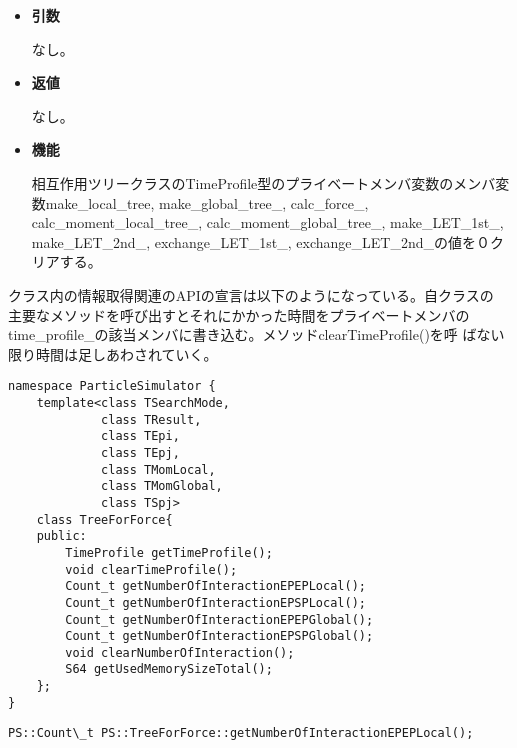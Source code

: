 \begin{itemize}

\item {\bf 引数}

なし。

\item {\bf 返値}

なし。

\item {\bf 機能}

相互作用ツリークラスのTimeProfile型のプライベートメンバ変数のメンバ変
数make\_local\_tree, make\_global\_tree\_, calc\_force\_,
calc\_moment\_local\_tree\_, calc\_moment\_global\_tree\_,
make\_LET\_1st\_, make\_LET\_2nd\_, exchange\_LET\_1st\_,
exchange\_LET\_2nd\_の値を０クリアする。

\end{itemize}


クラス内の情報取得関連のAPIの宣言は以下のようになっている。自クラスの
主要なメソッドを呼び出すとそれにかかった時間をプライベートメンバの
time\_profile\_の該当メンバに書き込む。メソッドclearTimeProfile()を呼
ばない限り時間は足しあわされていく。

\begin{lstlisting}[caption=TreeForForce2]
namespace ParticleSimulator {
    template<class TSearchMode,
             class TResult,
             class TEpi,
             class TEpj,
             class TMomLocal,
             class TMomGlobal,
             class TSpj>
    class TreeForForce{
    public:
        TimeProfile getTimeProfile();
        void clearTimeProfile();
        Count_t getNumberOfInteractionEPEPLocal();
        Count_t getNumberOfInteractionEPSPLocal();
        Count_t getNumberOfInteractionEPEPGlobal();
        Count_t getNumberOfInteractionEPSPGlobal();
        void clearNumberOfInteraction();
        S64 getUsedMemorySizeTotal();
    };
}
\end{lstlisting}



\begin{screen}
\begin{verbatim}
PS::Count\_t PS::TreeForForce::getNumberOfInteractionEPEPLocal();
\end{verbatim}
\end{screen}

